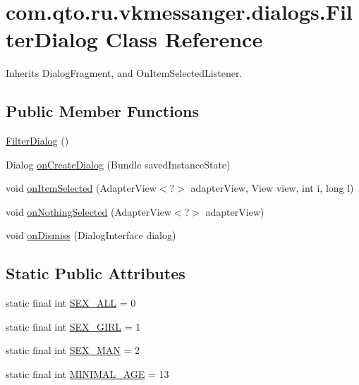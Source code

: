\hypertarget{classcom_1_1qto_1_1ru_1_1vkmessanger_1_1dialogs_1_1_filter_dialog}{}\section{com.\+qto.\+ru.\+vkmessanger.\+dialogs.\+Filter\+Dialog Class Reference}
\label{classcom_1_1qto_1_1ru_1_1vkmessanger_1_1dialogs_1_1_filter_dialog}


Inherits Dialog\+Fragment, and On\+Item\+Selected\+Listener.

\subsection*{Public Member Functions}
\begin{DoxyCompactItemize}
\item 
\hyperlink{classcom_1_1qto_1_1ru_1_1vkmessanger_1_1dialogs_1_1_filter_dialog_abd1b6c5a5b3a3f18ea7fa1abe2529a24}{Filter\+Dialog} ()
\item 
Dialog \hyperlink{classcom_1_1qto_1_1ru_1_1vkmessanger_1_1dialogs_1_1_filter_dialog_a9ed4f5b6de3b693942551e4939aaf3f6}{on\+Create\+Dialog} (Bundle saved\+Instance\+State)
\item 
void \hyperlink{classcom_1_1qto_1_1ru_1_1vkmessanger_1_1dialogs_1_1_filter_dialog_a97421cc4d91dbd21d507af34e423f1a6}{on\+Item\+Selected} (Adapter\+View$<$?$>$ adapter\+View, View view, int i, long l)
\item 
void \hyperlink{classcom_1_1qto_1_1ru_1_1vkmessanger_1_1dialogs_1_1_filter_dialog_ab9e8bffca8bf9408cbfd77e65219c530}{on\+Nothing\+Selected} (Adapter\+View$<$?$>$ adapter\+View)
\item 
void \hyperlink{classcom_1_1qto_1_1ru_1_1vkmessanger_1_1dialogs_1_1_filter_dialog_a6ad28e6a67cecb49674f7596663c2168}{on\+Dismiss} (Dialog\+Interface dialog)
\end{DoxyCompactItemize}
\subsection*{Static Public Attributes}
\begin{DoxyCompactItemize}
\item 
static final int \hyperlink{classcom_1_1qto_1_1ru_1_1vkmessanger_1_1dialogs_1_1_filter_dialog_ae6773e4e2d3af675f1e766ec8dd0e165}{S\+E\+X\+\_\+\+A\+L\+L} = 0
\item 
static final int \hyperlink{classcom_1_1qto_1_1ru_1_1vkmessanger_1_1dialogs_1_1_filter_dialog_a755c89b25499a16bcd8505e6f1a74ccc}{S\+E\+X\+\_\+\+G\+I\+R\+L} = 1
\item 
static final int \hyperlink{classcom_1_1qto_1_1ru_1_1vkmessanger_1_1dialogs_1_1_filter_dialog_a968ac6ce9f09963329e15ceae0cfa275}{S\+E\+X\+\_\+\+M\+A\+N} = 2
\item 
static final int \hyperlink{classcom_1_1qto_1_1ru_1_1vkmessanger_1_1dialogs_1_1_filter_dialog_a414309896eab5e405ef70b12c84ab0ff}{M\+I\+N\+I\+M\+A\+L\+\_\+\+A\+G\+E} = 13
\end{DoxyCompactItemize}


